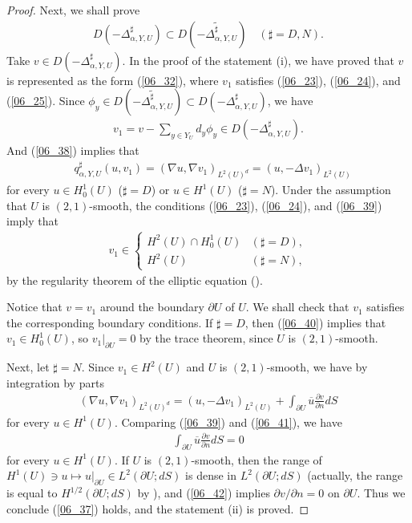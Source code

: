 \documentclass[12pt,a4paper]{article}
\begin{document}
\begin{proof}
Next, we shall prove
\begin{align}
 \label{06_37}
D(-\Delta^\sharp_{\alpha,Y,U})
\subset 
D(\widetilde{-\Delta^\sharp_{\alpha,Y,U}})
\quad
(\sharp=D,N).
\end{align}
Take $v\in D(-\Delta^\sharp_{\alpha,Y,U})$.
In the proof of the statement (i),
we have proved that
$v$ is represented as the form
(\ref{06_32}), where $v_1$ satisfies
(\ref{06_23}), (\ref{06_24}), and (\ref{06_25}).
Since $\phi_y\in D(\widetilde{-\Delta^\sharp_{\alpha,Y,U}})\subset D(-\Delta^\sharp_{\alpha,Y,U})$,
we have
\begin{align}
\label{06_38}
 v_1 = v-\sum_{y\in Y_U} d_y \phi_y\in 
D(-\Delta^\sharp_{\alpha,Y,U}).
\end{align}
And (\ref{06_38}) implies that
\begin{align}
& q^\sharp_{\alpha,Y,U}(u,v_1)
=
(\nabla u,\nabla v_1)_{L^2(U)^d}
=
(u,-\Delta v_1 )_{L^2(U)}
\label{06_39}
\end{align}
for every $u\in H^1_0(U)$ ($\sharp=D$)
or $u\in H^1(U)$ ($\sharp=N$).
Under 
the assumption that $U$ is $(2,1)$-smooth,
the conditions 
(\ref{06_23}), (\ref{06_24}), and (\ref{06_39})
imply that 
\begin{align}
 v_1\in 
\begin{cases}
H^2(U)\cap H^1_0(U) & (\sharp=D),\\
H^2(U) & (\sharp=N),
\end{cases}
\label{06_40}
\end{align}
by the regularity theorem of the elliptic equation (\cite[Theorem 20.4]{Wl}).

Notice that $v=v_1$ around the boundary $\partial U$ of $U$.
We shall check that $v_1$ satisfies the corresponding boundary conditions.
If $\sharp=D$, then 
(\ref{06_40}) implies that $v_1\in H^1_0(U)$,
so $v_1|_{\partial U}=0$ by the trace theorem,
since $U$ is $(2,1)$-smooth.

Next, let $\sharp=N$.
Since $v_1\in H^2(U)$ and $U$ is $(2,1)$-smooth,
we have by integration by parts
\begin{align}
 (\nabla u, \nabla v_1)_{L^2(U)^d}
=
(u,-\Delta v_1)_{L^2(U)}+\int_{\partial U}\overline{u}\frac{\partial v}{\partial n}dS
\label{06_41}
\end{align}
for every $u\in H^1(U)$.
Comparing (\ref{06_39}) and (\ref{06_41}),
we have
\begin{align}
\label{06_42}
\int_{\partial U}\overline{u}\frac{\partial v}{\partial n}dS=0
\end{align}
for every $u\in H^1(U)$.
If $U$ is $(2,1)$-smooth,
then the range of $H^1(U)\ni u \mapsto u|_{\partial U}\in L^2(\partial U;dS)$ 
is dense in $L^2(\partial U;dS)$
(actually, the range is equal to $H^{1/2}(\partial U;dS)$ 
by \cite[Theorem 8.9]{Wl}),
and (\ref{06_42}) implies ${\partial v}/{\partial n}=0$ on $\partial U$.
Thus we conclude (\ref{06_37}) holds,
and the statement (ii) is proved.



\end{proof}
\end{document}
